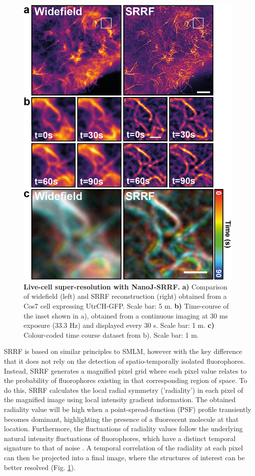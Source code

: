  \begin{figure}[!t]
    \centering
    \includegraphics{Figures/FigureSRRF_v5.png}
    \caption{\textbf{Live-cell super-resolution with NanoJ-SRRF.} \textbf{a)} Comparison of widefield (left) and SRRF reconstruction (right) obtained from a Cos7 cell expressing UtrCH-GFP. Scale bar: 5 \micro m. \textbf{b)} Time-course of the inset shown in a), obtained from  a continuous imaging at 30 ms exposure (33.3 Hz) and displayed every 30 s. Scale bar: 1 \micro m. \textbf{c)} Colour-coded time course dataset from b). Scale bar: 1 \micro m.}
    \label{fig:SRRF}
 \end{figure}
 
 SRRF is based on similar principles to SMLM, however with the key difference that it does not rely on the detection of spatio-temporally isolated fluorophores. Instead, SRRF generates a magnified pixel grid where each pixel value relates to the probability of fluorophores existing in that corresponding region of space. To do this, SRRF calculates the local radial symmetry ('radiality') in each pixel of the magnified image using local intensity gradient information. The obtained radiality value will be high when a point-spread-function (PSF) profile transiently becomes dominant, highlighting the presence of a fluorescent molecule at that location. Furthermore, the fluctuations of radiality values follow the underlying natural intensity fluctuations of fluorophores, which have a distinct temporal signature to that of noise \cite{dertinger2009fast}. A temporal correlation of the radiality at each pixel can then be projected into a final image, where the structures of interest can be better resolved (Fig. \ref{fig:SRRF}).

